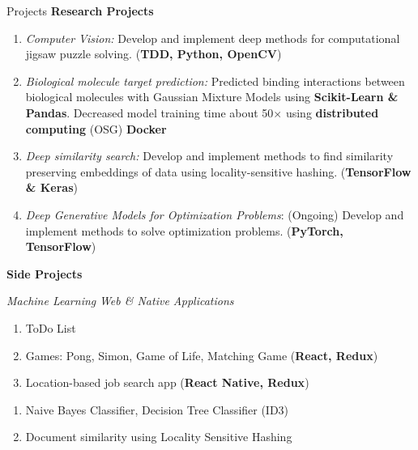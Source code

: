 \documentclass{resume} %
\newenvironment{cvEnum}
{ \begin{enumerate}[]
    \setlength{\itemsep}{0pt}
    \setlength{\parskip}{0pt}
    \setlength{\parsep}{0pt}     }
{ \end{enumerate}                  }
\begin{document}
\begin{rSection}{Projects}
{\bf Research Projects}
\begin{cvEnum}
\item {\em Computer Vision:}
 Develop and implement deep methods for computational jigsaw
       puzzle solving. (\textbf{TDD, Python, OpenCV})

     \item {\em Biological molecule target prediction:} Predicted
      binding interactions between biological molecules with Gaussian
      Mixture Models using \textbf{Scikit-Learn \& Pandas}. Decreased model training time about 50{$\times$}
      using
      \textbf{distributed computing} (OSG) \textbf{Docker}


    \item {\em Deep similarity search:} Develop and implement methods
      to find similarity preserving embeddings of data using
      locality-sensitive hashing. (\textbf{TensorFlow \& Keras})

    \item {\em Deep Generative Models for Optimization Problems}: (Ongoing) Develop and implement methods to solve optimization problems. (\textbf{PyTorch, TensorFlow})


\end{cvEnum}
{\bf Side Projects}

{\em Machine Learning}
{\em Web \& Native Applications}
\begin{cvEnum}
  \item ToDo List
  \item Games: Pong, Simon, Game of Life, Matching Game (\textbf{React, Redux})
  \item Location-based job search app  (\textbf{React Native, Redux})

      \end{cvEnum}
\begin{cvEnum}
    \item Naive Bayes Classifier, Decision Tree Classifier (ID3)
    \item Document similarity using Locality Sensitive Hashing
    \end{cvEnum}


\end{rSection}
\end{document}
